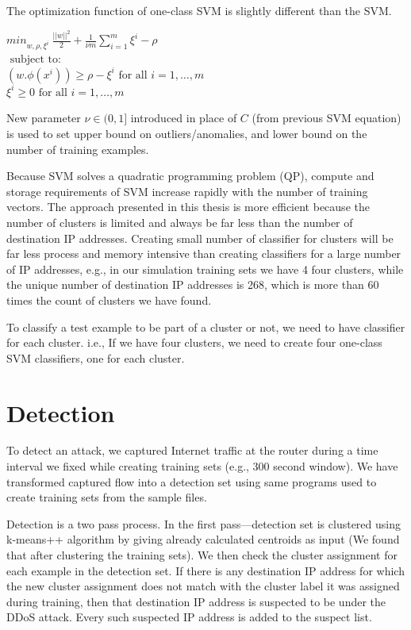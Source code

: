 \documentclass[12pt,oneside,a4paper]{article}
\begin{document}
The optimization function of one-class SVM is slightly different than the SVM. \cite{svm}

\begin{center}
  ${min}_{w,\rho,\xi^i} \ \frac{||w||^2}{2} + \frac{1}{\nu m} \sum_{i=1}^m \xi^i - \rho$ \\
  $\mbox{ subject to: }$ \\
  $(w.\phi(x^i)) \geq \rho - \xi^i \mbox{ for all } i = 1, \dots, m$ \\
  \hspace{2cm} $\xi^i \geq 0 \mbox{ for all } i = 1, \dots, m$ \\
\end{center}

New parameter $\nu \in (0,1]$ introduced in place of $C$ (from previous SVM equation) is used to set upper bound on outliers/anomalies, and lower bound on the number of training examples.

Because SVM solves a quadratic programming problem (QP), compute and storage requirements of SVM increase rapidly with the number of training vectors. The approach presented in this thesis is more efficient because the number of clusters is limited and always be far less than the number of destination IP addresses. Creating small number of classifier for clusters will be far less process and memory intensive than creating classifiers for a large number of IP addresses, e.g., in our simulation training sets we have 4 four clusters, while the unique number of destination IP addresses is 268, which is more than 60 times the count of clusters we have found.

To classify a test example to be part of a cluster or not, we need to have classifier for each cluster. i.e., If we have four clusters, we need to create four one-class SVM classifiers, one for each cluster.
\pagebreak
\section{Detection} \label{sec:Detection}

To detect an attack, we captured Internet traffic at the router during a time interval we fixed while creating training sets (e.g., 300 second window). We have transformed captured flow into a detection set using same programs used to create training sets from the sample files.

Detection is a two pass process. In the first pass---detection set is clustered using k-means++ algorithm by giving already calculated centroids as input (We found that after clustering the training sets). We then check the cluster assignment for each example in the detection set. If there is any destination IP address for which the new cluster assignment does not match with the cluster label it was assigned during training, then that destination IP address is suspected to be under the DDoS attack. Every such suspected IP address is added to the suspect list.
\end{document}

